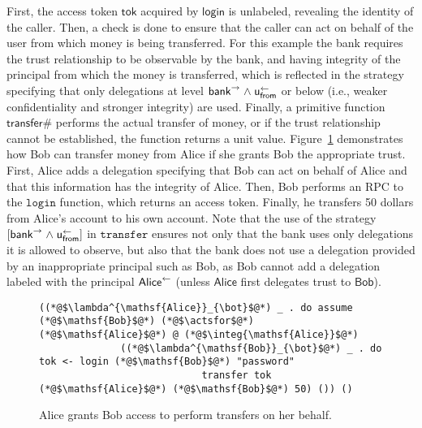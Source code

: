 First, the access token $\mathsf{tok}$ acquired by $\mathsf{login}$ is unlabeled, revealing the identity of the caller. Then, a check is done to ensure that the caller can act on behalf of the user from which money is being transferred. For this example the bank requires the trust relationship to be observable by the bank, and having integrity of the principal from which the money is transferred, which is reflected in the strategy specifying that only delegations at level $\mathsf{bank}^{\rightarrow} \mathrel{\land} \mathsf{u}_{\mathsf{from}}^{\leftarrow}$ or below (i.e., weaker confidentiality and stronger integrity) are used. Finally, a primitive function $\mathsf{transfer\#}$ performs the actual transfer of money, or if the trust relationship cannot be established, the function returns a unit value. Figure~\ref{fig:bob-transfer-from-alice} demonstrates how Bob can transfer money from Alice if she grants Bob the appropriate trust. First, Alice adds a delegation specifying that Bob can act on behalf of Alice and that this information has the integrity of Alice. Then, Bob performs an RPC to the $\mathtt{login}$ function, which returns an access token. Finally, he transfers 50 dollars from Alice's account to his own account. Note that the use of the strategy $[\mathsf{bank}^{\rightarrow} \mathrel{\land} \mathsf{u}_{\mathsf{from}}^{\leftarrow}]$ in $\mathtt{transfer}$ ensures not only that the bank uses only delegations it is allowed to observe, but also that the bank does not use a delegation provided by an inappropriate principal such as Bob, as Bob cannot add a delegation labeled with the principal $\mathsf{Alice}^{\leftarrow}$ (unless $\mathsf{Alice}$ first delegates trust to $\mathsf{Bob}$).

\begin{figure}
\centering
\begin{lstlisting}
((*@$\lambda^{\mathsf{Alice}}_{\bot}$@*) _ . do assume (*@$\mathsf{Bob}$@*) (*@$\actsfor$@*) (*@$\mathsf{Alice}$@*) @ (*@$\integ{\mathsf{Alice}}$@*)
              ((*@$\lambda^{\mathsf{Bob}}_{\bot}$@*) _ . do tok <- login (*@$\mathsf{Bob}$@*) "password"
                            transfer tok (*@$\mathsf{Alice}$@*) (*@$\mathsf{Bob}$@*) 50) ()) ()
\end{lstlisting}
\caption{Alice grants Bob access to perform transfers on her behalf.}
\label{fig:bob-transfer-from-alice}
\end{figure}
